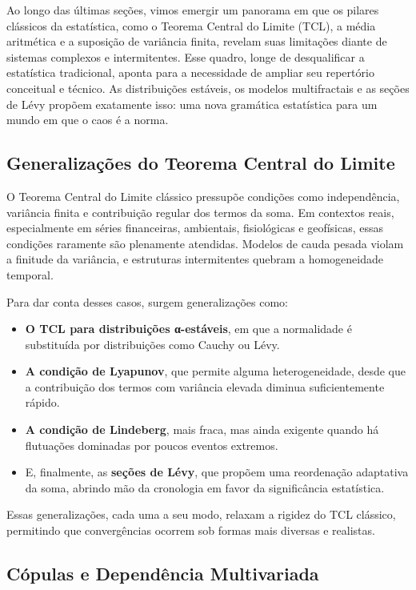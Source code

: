 \documentclass[
  letterpaper,
  DIV=11,
  numbers=noendperiod]{scrartcl}
\providecommand{\tightlist}{%
  \setlength{\itemsep}{0pt}\setlength{\parskip}{0pt}}\usepackage{longtable,booktabs,array}
\begin{document}
Ao longo das últimas seções, vimos emergir um panorama em que os pilares
clássicos da estatística, como o Teorema Central do Limite (TCL), a
média aritmética e a suposição de variância finita, revelam suas
limitações diante de sistemas complexos e intermitentes. Esse quadro,
longe de desqualificar a estatística tradicional, aponta para a
necessidade de ampliar seu repertório conceitual e técnico. As
distribuições estáveis, os modelos multifractais e as seções de Lévy
propõem exatamente isso: uma nova gramática estatística para um mundo em
que o caos é a norma.

\subsection{Generalizações do Teorema Central do
Limite}\label{generalizauxe7uxf5es-do-teorema-central-do-limite}

O Teorema Central do Limite clássico pressupõe condições como
independência, variância finita e contribuição regular dos termos da
soma. Em contextos reais, especialmente em séries financeiras,
ambientais, fisiológicas e geofísicas, essas condições raramente são
plenamente atendidas. Modelos de cauda pesada violam a finitude da
variância, e estruturas intermitentes quebram a homogeneidade temporal.

Para dar conta desses casos, surgem generalizações como:

\begin{itemize}
\tightlist
\item
  \textbf{O TCL para distribuições α-estáveis}, em que a normalidade é
  substituída por distribuições como Cauchy ou Lévy.
\item
  \textbf{A condição de Lyapunov}, que permite alguma heterogeneidade,
  desde que a contribuição dos termos com variância elevada diminua
  suficientemente rápido.
\item
  \textbf{A condição de Lindeberg}, mais fraca, mas ainda exigente
  quando há flutuações dominadas por poucos eventos extremos.
\item
  E, finalmente, as \textbf{seções de Lévy}, que propõem uma reordenação
  adaptativa da soma, abrindo mão da cronologia em favor da
  significância estatística.
\end{itemize}

Essas generalizações, cada uma a seu modo, relaxam a rigidez do TCL
clássico, permitindo que convergências ocorrem sob formas mais diversas
e realistas.

\subsection{Cópulas e Dependência
Multivariada}\label{cuxf3pulas-e-dependuxeancia-multivariada}
\end{document}

